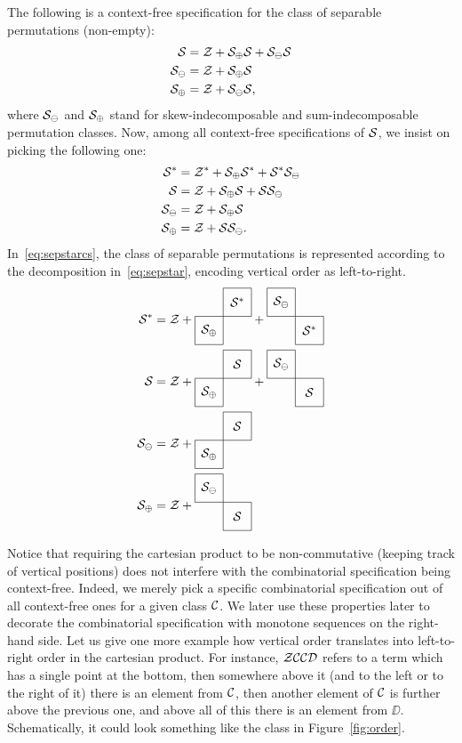 \message{ !name(thesis.tex)}\documentclass[12pt, a4paper, twoside]{report}
\begin{document}
\begin{example}
  The following is a context-free specification for the class of separable permutations (non-empty):
  \begin{align*}
    \S &= \Z + \S_{\oplus}\S + \S_{\ominus}\S\\
    \S_{\ominus} &= \Z + \S_\oplus\S\\
    \S_\oplus &= \Z + \S_\ominus\S,
  \end{align*}
  where $\S_\ominus$ and $\S_\oplus$ stand for skew-indecomposable and sum-indecomposable permutation classes. Now, among all context-free specifications of $\S$, we insist on picking the following one:
  \begin{align}
    \begin{aligned}
    \S^* &= \Z^* + \S_{\oplus}\S^* + \S^*\S_{\ominus}\\
    \S &= \Z + \S_{\oplus}\S + \S\S_{\ominus}\\
    \S_{\ominus} &= \Z + \S_\oplus\S\\
    \S_\oplus &= \Z + \S\S_\ominus.
    \label{eq:sepstarcs}
  \end{aligned}
  \end{align}
  In~\eqref{eq:sepstarcs}, the class of separable permutations is represented according to the decomposition in~\eqref{eq:sepstar}, encoding vertical order as left-to-right.
  \begin{align}
    \begin{aligned}
      \S^* &= \Z + \cplusc{\S_\oplus}{\S^*} + \cminusc{\S^*}{\S_\ominus}\\
      \S &= \Z + \cplusc{\S_\oplus}{\S} + \cminusc{\S}{\S_\ominus}\\
      \S_\ominus &= \Z + \cplusc{\S_\oplus}{\S}\\
      \S_\oplus &= \Z + \cminusc{\S}{\S_\ominus}
    \label{eq:sepstar}
  \end{aligned}
  \end{align}
\end{example}
Notice that requiring the cartesian product to be non-commutative (keeping track of vertical positions) does not interfere with the combinatorial specification being context-free. Indeed, we merely pick a specific combinatorial specification out of all context-free ones for a given class $\C$. We later use these properties later to decorate the combinatorial specification with monotone sequences on the right-hand side. Let us give one more example how vertical order translates into left-to-right order in the cartesian product. For instance, $\Z\C\C\DD$ refers to a term which has a single point at the bottom, then somewhere above it (and to the left or to the right of it) there is an element from $\C$, then another element of $\C$ is further above the previous one, and above all of this there is an element from $\DD$. Schematically, it could look something like the class in Figure~\ref{fig:order}.
\end{document}

